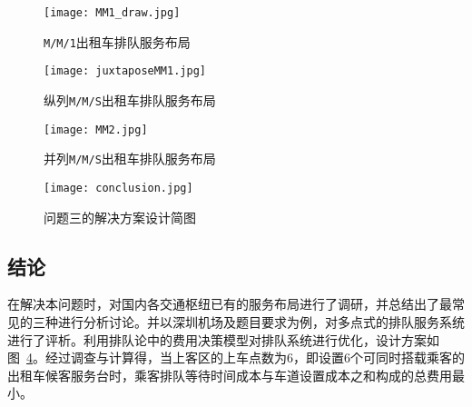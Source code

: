 \begin{figure}
    \centering
    \texttt{[image: MM1\_draw.jpg]}
    \caption{\texttt{M/M/1}出租车排队服务布局}\label{fig:MM1_draw}
\end{figure}

\begin{figure}
    \centering
    \texttt{[image: juxtaposeMM1.jpg]}
    \caption{纵列\texttt{M/M/S}出租车排队服务布局}\label{fig:juxtaMM1}
\end{figure}

\begin{figure}
    \centering
    \texttt{[image: MM2.jpg]}
    \caption{并列\texttt{M/M/S}出租车排队服务布局}\label{fig:juxtaMM2}
\end{figure}



\begin{figure}
    \centering
    \texttt{[image: conclusion.jpg]}
    \caption{问题三的解决方案设计简图}\label{fig:conclusion}
\end{figure}







\subsection{结论}
在解决本问题时，对国内各交通枢纽已有的服务布局进行了调研，并总结出了最常见的三种进行分析讨论。并以深圳机场及题目要求为例，对多点式的排队服务系统进行了评析。利用排队论中的费用决策模型对排队系统进行优化，设计方案如图~\ref{fig:conclusion}。经过调查与计算得，当上客区的上车点数为6，即设置6个可同时搭载乘客的出租车候客服务台时，乘客排队等待时间成本与车道设置成本之和构成的总费用最小。

